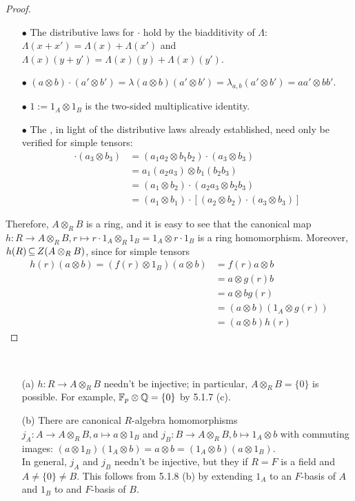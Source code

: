 \documentclass[11pt]{book}
\theoremstyle{definition}   \newtheorem{defn}[counter]{Definition} %
\DeclareMathOperator{\ra}{\rightarrow}   \DeclareMathOperator{\Poly}{\mathbf{P}}   \DeclareMathOperator{\spn}{\textnormal{span}}   \DeclareMathOperator{\aut}{\textnormal{Aut}}
\newcommand{\vs}{\vspace{8pt}}   \newcommand{\hs}{\hspace{8pt}}
\numberwithin{counter}{chapter}
\begin{document}
\begin{proof}
\begin{enumerate}
\item[$\bullet$] The distributive laws for $\cdot$ hold by the biadditivity of $\Lambda$: $\Lambda(x + x') = \Lambda(x) + \Lambda(x')$ and $\Lambda(x)(y + y') = \Lambda(x)(y) + \Lambda(x)(y')$. 
\item[$\bullet$] $(a \otimes b) \cdot (a' \otimes b') = \lambda (a \otimes b)(a' \otimes b') = \lambda_{a,b}(a' \otimes b') = aa' \otimes bb'$. 
\item[$\bullet$] $1 := 1_A \otimes 1_B$ is the two-sided multiplicative identity.
\item[$\bullet$] The , in light of the distributive laws already established, need only be verified for simple tensors:
\begin{align*} 
[(a_1 \otimes b_1) \cdot (a_2 \otimes b_2)] \cdot (a_3 \otimes b_3) &= (a_1 a_2 \otimes b_1 b_2) \cdot (a_3 \otimes b_3) \\
&= a_1 (a_2 a_3) \otimes b_1 (b_2 b_3) \\
&= (a_1 \otimes b_2) \cdot (a_2 a_3 \otimes b_2 b_3) \\
&= (a_1 \otimes b_1) \cdot [(a_2 \otimes b_2) \cdot (a_3 \otimes b_3)]
\end{align*} 
\end{enumerate}
Therefore, $A \otimes_R B$ is a ring, and it is easy to see that the canonical map $h : R \ra A \otimes_R B, r \mapsto r \cdot 1_A \otimes_R 1_B = 1_A \otimes r \cdot 1_B$ is a ring homomorphism. Moreover, $h(R) \operatorname{\subseteq} Z(A \otimes_R B)$, since for simple tensors
	\begin{align*} 
	h(r) (a \otimes b) = (f(r) \otimes 1_B)(a \otimes b) &= f(r) a \otimes b \\
	&= a \otimes g(r) b \\
	&= a \otimes b g(r) \\
	&= (a \otimes b)(1_A \otimes g(r)) \\
	&= (a \otimes b) h(r) 
	\end{align*} 
\end{proof}

\vs

\begin{remark}\ 
\begin{enumerate}
\item[(a)] $h : R \ra A \otimes_R B$ needn't be injective; in particular, $A \otimes_R B = \{0\}$ is possible. For example, $\mathbb{F}_p \otimes \operatorname{\mathbb{Q}} = \{0\}$ by 5.1.7 (c).
\item[(b)] There are canonical $R$-algebra homomorphisms $j_A : A \ra A \otimes_R B, a \mapsto a \otimes 1_B$ and $j_B : B \ra A \otimes_R B, b \mapsto 1_A \otimes b$ with commuting images: $(a \otimes 1_B)(1_A \otimes b) = a \otimes b = (1_A \otimes b)(a \otimes 1_B)$. \\

In general, $j_A$ and $j_B$ needn't be injective, but they  if $R = F$ is a field and $A \ne \{0\} \ne B$. This follows from 5.1.8 (b) by extending $1_A$ to an $F$-basis of $A$ and $1_B$ to and $F$-basis of $B$. 
\end{enumerate}
\end{remark}
\end{document}
